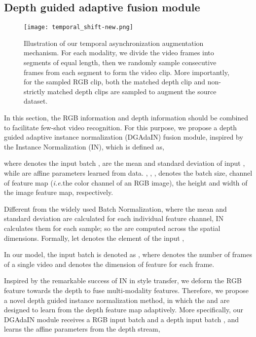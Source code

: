 \documentclass[sigconf]{acmart}
\def\ie{\textit{i.e.}}
\begin{document}
	
	
	
	\subsection{Depth guided adaptive fusion module}
	
	\begin{figure*}[!h]\centering
		{\texttt{[image: temporal\_shift-new.png]}}
		\caption{Illustration of our temporal asynchronization augmentation mechanism. For each modality, we divide the video frames into  segments of equal length, then we randomly sample  consecutive frames from each segment to form the video clip.  More importantly, for the sampled RGB clip, both the matched depth clip and non-strictly matched depth clips are sampled to augment the source dataset.}
		\label{shift} \end{figure*}
	
	In this section, the RGB information and depth information should be combined to facilitate few-shot video recognition. For this purpose, we propose a depth guided adaptive instance normalization (DGAdaIN) fusion module, inspired by the Instance Normalization (IN), which is defined as,
	
	\noindent where  denotes the input batch ,   are the mean and standard deviation of input , while  are affine parameters learned from data. 
	, , ,  denotes the batch size,  channel of feature map (\ie the color channel of an RGB image),  the height and width of the image feature map, respectively.
	
	
	Different from the widely used Batch Normalization, where the mean and standard deviation are calculated for each individual feature channel, IN calculates them for each sample; so the  are computed across the spatial dimensions. Formally,  let  denotes the {} element of the input ,
	
	
	
	In our model, the input batch is denoted as , where  denotes the number of frames of a single video and  denotes the dimension of feature for each frame.
	
	Inspired by the remarkable success of IN in style transfer, we deform the RGB feature towards the depth to fuse multi-modality features. 
	Therefore, we propose a novel depth guided instance normalization method, in which the  and  are designed to learn from the depth feature map adaptively.
	More specifically, our DGAdaIN module  receives a RGB input batch   and a depth input batch  ,  and learns the affine parameters from the depth stream,
	
\end{document}
